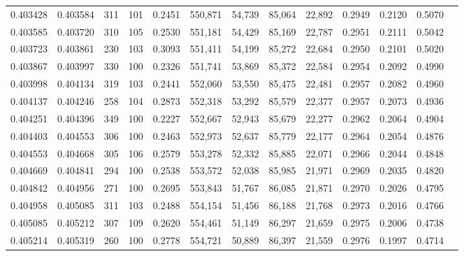 \begin{tabular}{rrrrrrrrrrrrr}
0.403428 & 0.403584 &   311 & 101 &                                     0.2451 & 550,871 &  54,739 &  85,064 &  22,892 & 0.2949 & 0.2120 & 0.5070 \\
0.403585 & 0.403720 &   310 & 105 &                                     0.2530 & 551,181 &  54,429 &  85,169 &  22,787 & 0.2951 & 0.2111 & 0.5042 \\
0.403723 & 0.403861 &   230 & 103 &                                     0.3093 & 551,411 &  54,199 &  85,272 &  22,684 & 0.2950 & 0.2101 & 0.5020 \\
0.403867 & 0.403997 &   330 & 100 &                                     0.2326 & 551,741 &  53,869 &  85,372 &  22,584 & 0.2954 & 0.2092 & 0.4990 \\
0.403998 & 0.404134 &   319 & 103 &                                     0.2441 & 552,060 &  53,550 &  85,475 &  22,481 & 0.2957 & 0.2082 & 0.4960 \\
0.404137 & 0.404246 &   258 & 104 &                                     0.2873 & 552,318 &  53,292 &  85,579 &  22,377 & 0.2957 & 0.2073 & 0.4936 \\
0.404251 & 0.404396 &   349 & 100 &                                     0.2227 & 552,667 &  52,943 &  85,679 &  22,277 & 0.2962 & 0.2064 & 0.4904 \\
0.404403 & 0.404553 &   306 & 100 &                                     0.2463 & 552,973 &  52,637 &  85,779 &  22,177 & 0.2964 & 0.2054 & 0.4876 \\
0.404553 & 0.404668 &   305 & 106 &                                     0.2579 & 553,278 &  52,332 &  85,885 &  22,071 & 0.2966 & 0.2044 & 0.4848 \\
0.404669 & 0.404841 &   294 & 100 &                                     0.2538 & 553,572 &  52,038 &  85,985 &  21,971 & 0.2969 & 0.2035 & 0.4820 \\
0.404842 & 0.404956 &   271 & 100 &                                     0.2695 & 553,843 &  51,767 &  86,085 &  21,871 & 0.2970 & 0.2026 & 0.4795 \\
0.404958 & 0.405085 &   311 & 103 &                                     0.2488 & 554,154 &  51,456 &  86,188 &  21,768 & 0.2973 & 0.2016 & 0.4766 \\
0.405085 & 0.405212 &   307 & 109 &                                     0.2620 & 554,461 &  51,149 &  86,297 &  21,659 & 0.2975 & 0.2006 & 0.4738 \\
0.405214 & 0.405319 &   260 & 100 &                                     0.2778 & 554,721 &  50,889 &  86,397 &  21,559 & 0.2976 & 0.1997 & 0.4714 \\

\end{tabular}

